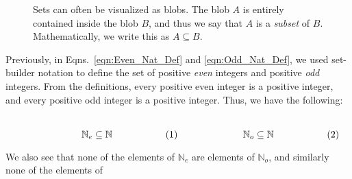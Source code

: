             \begin{figure}[H]
                \centering
                \captionsetup{type=figure}
                
                \caption[Visual for Subsets]
                        {Sets can often be visualized as blobs.
                         The blob $A$ is entirely contained
                         inside the blob $B$, and thus we say
                         that $A$ is a
                         \textit{subset} of $B$. Mathematically,
                         we write this
                         as $A\subseteq{B}$.}
                \label{fig:Elem_Alg_Subsets_Example}
            \end{figure}
            \begin{lexample}{}{}
                Previously, in Eqns.~\ref{eqn:Even_Nat_Def} and
                \ref{eqn:Odd_Nat_Def}, we used set-builder notation to
                define the set of positive \textit{even} integers and
                positive \textit{odd} integers. From the definitions, every
                positive even integer is a positive integer, and every
                positive odd integer is a positive integer.
                Thus, we have the following:
                \par
                \begin{subequations}
                    \begin{minipage}{0.49\textwidth}
                        \centering
                        \begin{equation}
                            \mathbb{N}_{e}\subseteq\mathbb{N}
                        \end{equation}
                    \end{minipage}
                    \hfill
                    \begin{minipage}{0.49\textwidth}
                        \centering
                        \begin{equation}
                            \mathbb{N}_{o}\subseteq\mathbb{N}
                        \end{equation}
                    \end{minipage}
                \end{subequations}
                \par\vspace{2.5ex}
                We also see that none of the elements of
                $\mathbb{N}_{e}$ are elements of $\mathbb{N}_{o}$,
                and similarly none of the elements of

\end{lexample}

